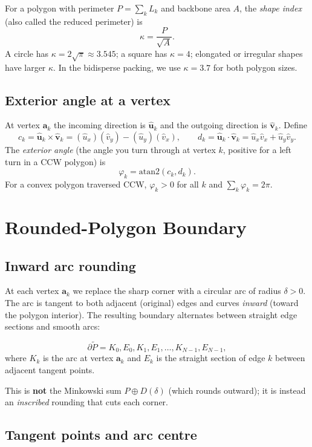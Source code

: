 \documentclass[12pt]{article}
\newcommand{\uvec}{\hat{\mathbf{u}}}
\newcommand{\vvec}{\hat{\mathbf{v}}}
\begin{document}
For a polygon with perimeter $P = \sum_k L_k$ and backbone area $A$, the
\emph{shape index} (also called the reduced perimeter) is
\[
  \kappa = \frac{P}{\sqrt{A}}.
\]
A circle has $\kappa = 2\sqrt{\pi} \approx 3.545$; a square has $\kappa = 4$;
elongated or irregular shapes have larger $\kappa$.  In the bidisperse packing,
we use $\kappa = 3.7$ for both polygon sizes.

\subsection{Exterior angle at a vertex}

At vertex $\mathbf{a}_k$ the incoming direction is $\uvec_k$ and the outgoing
direction is $\vvec_k$.  Define
\[
  c_k = \uvec_k \times \vvec_k = (\hat u_x)(\hat v_y) - (\hat u_y)(\hat v_x), \qquad
  d_k = \uvec_k \cdot \vvec_k = \hat u_x \hat v_x + \hat u_y \hat v_y.
\]
The \emph{exterior angle} (the angle you turn through at vertex $k$, positive for a
left turn in a CCW polygon) is
\[
  \varphi_k = \mathrm{atan2}(c_k, d_k).
\]
For a convex polygon traversed CCW, $\varphi_k > 0$ for all $k$ and
$\sum_k \varphi_k = 2\pi$.

\section{Rounded-Polygon Boundary}

\subsection{Inward arc rounding}

At each vertex $\mathbf{a}_k$ we replace the sharp corner with a circular arc of
radius $\delta > 0$.  The arc is tangent to both adjacent (original) edges and
curves \emph{inward} (toward the polygon interior).  The resulting boundary
alternates between straight edge sections and smooth arcs:

\[
  \partial \tilde P = K_0, E_0, K_1, E_1, \ldots, K_{N-1}, E_{N-1},
\]
where $K_k$ is the arc at vertex $\mathbf{a}_k$ and $E_k$ is the straight section
of edge $k$ between adjacent tangent points.

This is \textbf{not} the Minkowski sum $P \oplus D(\delta)$ (which rounds outward);
it is instead an \emph{inscribed} rounding that cuts each corner.

\subsection{Tangent points and arc centre}
\label{sec:arcgeom}
\end{document}
